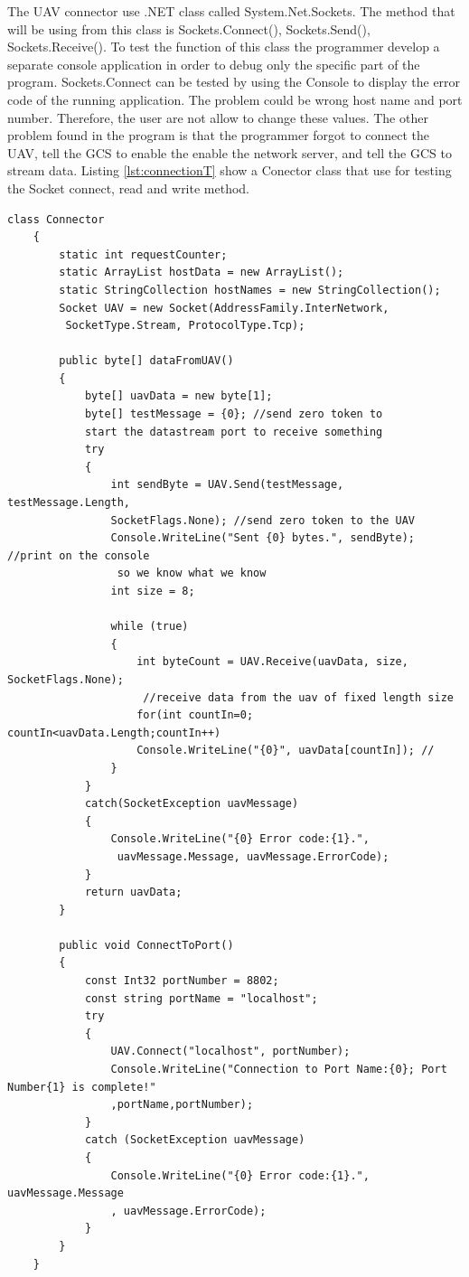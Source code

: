 \documentclass[oneside]{ecsgdp}         %
\begin{document}
The UAV connector use .NET class called System.Net.Sockets. The method that will be using from this class is Sockets.Connect(), Sockets.Send(), Sockets.Receive(). To test the function of this class the programmer develop a separate console application in order to debug only the specific part of the program. Sockets.Connect can be tested by using the Console to display the error code of the running application. The problem could be wrong host name and port number. Therefore, the user are not allow to change these values. The other problem found in the program is that the programmer forgot to connect the UAV, tell the GCS to enable the enable the network server, and tell the GCS to stream data. Listing \ref{lst:connectionT} show a Conector class that use for testing the Socket connect, read and write method.
\begin{lstlisting}[caption=the class that use to test the connection to the UAV,label=lst:connectionT]
    class Connector
    {
        static int requestCounter;
        static ArrayList hostData = new ArrayList();
        static StringCollection hostNames = new StringCollection();
        Socket UAV = new Socket(AddressFamily.InterNetwork,
         SocketType.Stream, ProtocolType.Tcp);

        public byte[] dataFromUAV()
        {
            byte[] uavData = new byte[1];
            byte[] testMessage = {0}; //send zero token to 
            start the datastream port to receive something
            try
            {
                int sendByte = UAV.Send(testMessage, testMessage.Length, 
                SocketFlags.None); //send zero token to the UAV
                Console.WriteLine("Sent {0} bytes.", sendByte); //print on the console
                 so we know what we know
                int size = 8;

                while (true)
                {
                    int byteCount = UAV.Receive(uavData, size, SocketFlags.None);
                     //receive data from the uav of fixed length size
                    for(int countIn=0; countIn<uavData.Length;countIn++)
                    Console.WriteLine("{0}", uavData[countIn]); //
                }
            }
            catch(SocketException uavMessage)
            {
                Console.WriteLine("{0} Error code:{1}.",
                 uavMessage.Message, uavMessage.ErrorCode);
            }
            return uavData;
        }

        public void ConnectToPort()
        {
            const Int32 portNumber = 8802;
            const string portName = "localhost";
            try
            {
                UAV.Connect("localhost", portNumber);
                Console.WriteLine("Connection to Port Name:{0}; Port Number{1} is complete!"
                ,portName,portNumber);
            }
            catch (SocketException uavMessage)
            {
                Console.WriteLine("{0} Error code:{1}.", uavMessage.Message
                , uavMessage.ErrorCode);
            }
        }
    }
\end{lstlisting}
\end{document}
